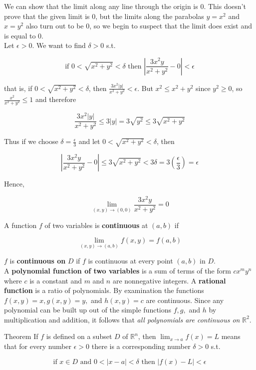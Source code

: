         We can show that the limit along any line through the origin is 0. This doesn't prove that the given limit is 0, but the limits along the parabolas $y=x^2$ and $x=y^2$ also turn out to be 0, so we begin to suspect
        that the limit does exist and is equal to 0. \\

        Let $\epsilon > 0$. We want to find $\delta > 0$ s.t.

        \[
            \text{if } 0 < \sqrt{x^2 + y^2} < \delta \text{ then } \left|\frac{3x^2 y}{x^2 + y^2} - 0\right| < \epsilon
        \]

        that is, if $0 < \sqrt{x^2 + y^2} < \delta$, then $\frac{3x^2 |y|}{x^2 + y^2} < \epsilon$. But $x^2 \leq x^2 + y^2$ since $y^2 \geq 0$, so $\frac{x^2}{x^2 + y^2} \leq 1$ and therefore

        \[
            \frac{3x^2 |y|}{x^2 + y^2}\leq 3|y| = 3\sqrt{y^2} \leq 3 \sqrt{x^2 + y^2}
        \]

        Thus if we choose $\delta = \frac{\epsilon}{3}$ and let $0 < \sqrt{x^2 + y^2} < \delta$, then

        \[
            \left|\frac{3x^2 y}{x^2 + y^2} - 0\right| \leq 3 \sqrt{x^2 + y^2}  < 3\delta = 3\left(\frac{\epsilon}{3}\right) = \epsilon
        \]

        Hence,

        \[
            \lim_{(x,y) \to (0,0)} \frac{3x^2 y}{x^2 + y^2} = 0
        \]

        A function $f$ of two variables is \textbf{continuous} at $(a,b)$ if

        \[
            \lim_{(x,y) \to (a,b)} f(x,y) = f(a,b)
        \]

        $f$ is \textbf{continuous on} $D$ if $f$ is continuous at every point $(a,b)$ in $D$. \\

        A \textbf{polynomial function of two variables} is a sum of terms of the form $cx^m y^n$ where $c$ is a constant and $m$ and $n$ are nonnegative integers. A \textbf{rational function} is a ratio of polynomials.
        By examination the functions $f(x,y) = x,g(x,y) = y,$ and $h(x,y)=c$ are continuous. Since any polynomial can be built up out of the simple functions $f,g,$ and $h$ by multiplication and addition, it follows that
        \textit{all polynomials are continuous on} $\mathbb{R}^2$.

        \begin{theorem}{Theorem}
            If $f$ is defined on a subset $D$ of $\mathbb{R}^n$, then $\lim_{x\to a} f(x) = L$ means that for every number $\epsilon > 0$ there is a corresponding number $\delta > 0$ s.t.

            \[
                \text{if } x\in D \text{ and } 0 < |x-a| < \delta \text{ then } |f(x) - L| < \epsilon
            \]
        \end{theorem}


